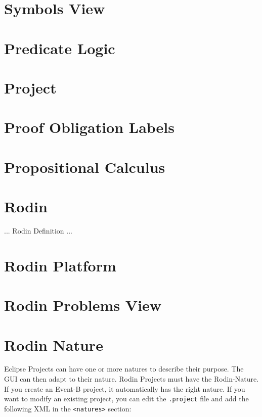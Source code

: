 \section{Symbols View}
\label{symbols_view}

\section{Predicate Logic}
\label{predicate_logic}

\section{Project}
\label{project}

\section{Proof Obligation Labels}
\label{po_labels}

\section{Propositional Calculus}
\label{propositional_calculus}

\section{Rodin}
\label{rodin}

... Rodin Definition ...


\section{Rodin Platform}
\label{rodin_platform}

\section{Rodin Problems View}
\label{rodin_problems_view}


\section{Rodin Nature}
\label{rodin_nature}

Eclipse Projects can have one or more natures to describe their purpose.  The GUI can then adapt to their nature.  Rodin Projects must have the Rodin-Nature.  If you create an Event-B project, it automatically has the right nature.  If you want to modify an existing project, you can edit the \texttt{.project} file and add the following XML in the \texttt{<natures>} section:

